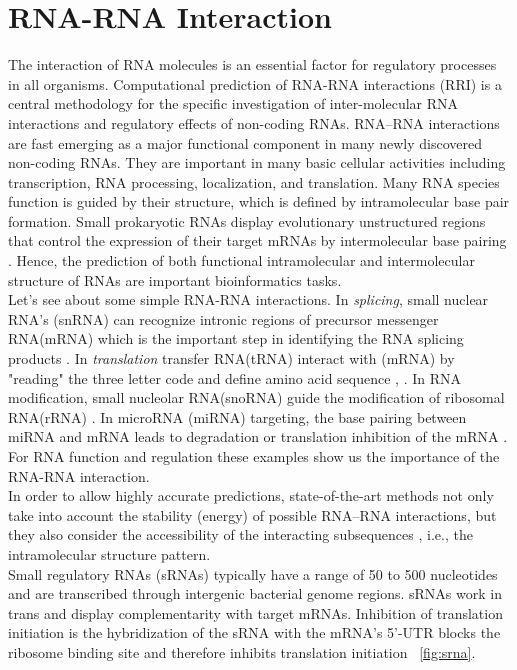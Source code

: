 \documentclass[twoside,a4paper]{report}
\numberwithin{equation}{section}
\begin{document}
	\section{RNA-RNA Interaction}
 	The interaction of RNA molecules is an essential factor for regulatory processes in all organisms. Computational prediction of RNA-RNA interactions (RRI) is a central methodology for the specific investigation of inter-molecular RNA interactions and regulatory effects of non-coding RNAs. RNA–RNA interactions are fast emerging as a major functional component in many newly discovered non-coding RNAs. They are important in many basic cellular activities including transcription, RNA processing, localization, and translation.  Many RNA species function is guided by their structure, which is defined by intramolecular base pair formation. Small prokaryotic RNAs display evolutionary unstructured regions that control the expression of their target mRNAs by intermolecular base pairing \citep{wright2013comparative}. Hence, the prediction of both functional intramolecular and intermolecular structure of RNAs are important bioinformatics tasks. \\
 	
 	Let's see about some simple RNA-RNA interactions. In \textit{splicing}, small nuclear RNA's (snRNA) can recognize intronic regions of precursor messenger RNA(mRNA) which is the important step in identifying the RNA splicing products \citep{modrek2002genomic}. In \textit{translation} transfer RNA(tRNA) interact with (mRNA) by "reading" the three letter code and define amino acid sequence \citep{selmer2006structure}, \citep{ibba2000aminoacyl}. In RNA modification, small nucleolar RNA(snoRNA) guide the modification of ribosomal RNA(rRNA) \citep{kiss2002small}. In microRNA (miRNA) targeting, the base pairing between  miRNA and mRNA leads to degradation or translation inhibition of the mRNA \citep{bartel2004micrornas}. For RNA function and regulation these examples show us the importance of the RNA-RNA interaction. \\
 		
 	In order to allow highly accurate predictions, state-of-the-art methods not only take into account the stability (energy) of possible RNA–RNA interactions, but they also consider the accessibility of the interacting subsequences \citep{umu2017comprehensive}, i.e., the intramolecular structure pattern.\\
 	
 	Small regulatory RNAs (sRNAs) typically have a range of 50 to 500 nucleotides and are transcribed through intergenic bacterial genome regions. sRNAs work in trans and display complementarity with target mRNAs. Inhibition of translation initiation is the hybridization of the sRNA with the mRNA's 5'-UTR blocks the ribosome binding site and therefore inhibits translation initiation ~\ref{fig:srna}. \\
 	
\end{document}
